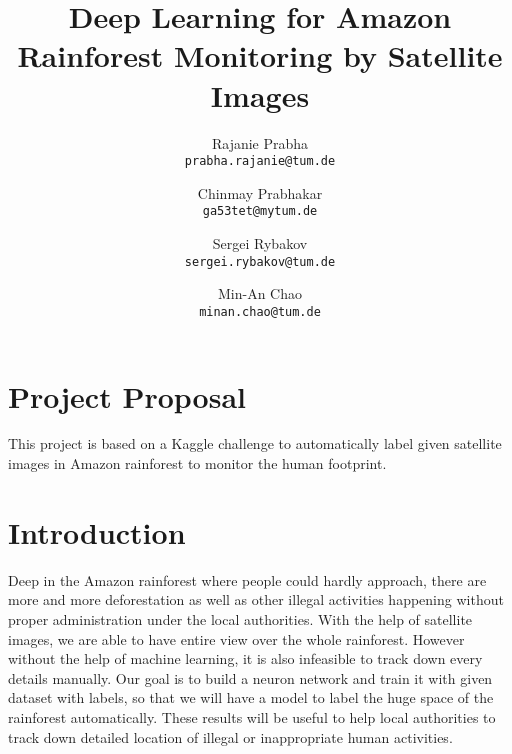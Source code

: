\documentclass[10pt,twocolumn,letterpaper]{article}
\begin{document}
\title{Deep Learning for Amazon Rainforest Monitoring by Satellite Images}

\author{Rajanie Prabha\\
{\tt\small prabha.rajanie@tum.de}
\and
Chinmay Prabhakar\\
{\tt\small ga53tet@mytum.de}
\and
Sergei Rybakov\\
{\tt\small sergei.rybakov@tum.de}
\and
Min-An Chao\\
{\tt\small minan.chao@tum.de}
}


\maketitle

%
%
\section*{Project Proposal}
This project is based on a Kaggle challenge
to automatically label given satellite images in Amazon rainforest 
to monitor the human footprint.

\section{Introduction}
    Deep in the Amazon rainforest where people could hardly approach,
    there are more and more deforestation as well as other illegal activities
    happening without proper administration under the local authorities.
    With the help of satellite images,
    we are able to have entire view over the whole rainforest.
    However without the help of machine learning,
    it is also infeasible to track down every details manually.
    Our goal is to build a neuron network 
    and train it with given dataset with labels,
    so that we will have a model to label the huge space of the rainforest
    automatically.
    These results will be useful to help local authorities to track down
    detailed location of illegal or inappropriate human activities.
\end{document}
